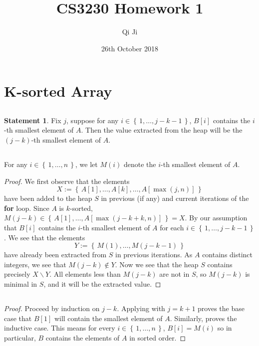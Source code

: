 \documentclass[british,a4paper,]{article}
\title{CS3230 Homework 1}
\author{Qi Ji}
\date{26th October 2018}
\theoremstyle{definition}
\newtheorem{statement}{Statement}[subsection]
\newcommand{\set}[1]{\left\{\, #1 \,\right\}}
\begin{document}
\maketitle

\section{K-sorted Array}
\subsection{}
\begin{statement} \label{q1claim}
    Fix \(j\), suppose for any \(i \in \set{1,\dots,j-k-1}\),
    \(B[i]\) contains the \(i\)-th smallest element of \(A\).
    Then the value extracted from the heap will be the \((j-k)\)-th smallest element of \(A\).
\end{statement}

\subsection{}
For any \(i \in \set{1,\dots,n}\), we let \(M(i)\) denote the \(i\)-th smallest element of \(A\).

\begin{proof}
    We first observe that the elements
    \[ X := \set{ A[1], \dots, A[k], \dots, A[\max(j,n)] } \]
    have been added to the heap \(S\) in previous (if any) and current iterations of the \textbf{for} loop.
    Since \(A\) is \(k\)-sorted, \(M(j-k) \in \set{A[1],\dots,A[\max(j-k+k,n)]} = X\).
    By our assumption that \(B[i]\) contains the \(i\)-th smallest element of \(A\) for each \(i\in\set{1,\dots, j-k-1}\).
    We see that the elements
    \[ Y := \set{ M(1), \dots, M(j-k-1) } \]
    have already been extracted from \(S\) in previous iterations.
    As \(A\) contains distinct integers, we see that \(M(j-k)\notin Y\).
    Now we see that the heap \(S\) contains precisely \(X \smallsetminus Y\).
    All elements less than \(M(j-k)\) are not in \(S\), so
    \(M(j-k)\) is minimal in \(S\), and it will be the extracted value.
\end{proof}

\subsection{}
\begin{proof}
    Proceed by induction on \(j-k\).
    Applying  with \(j = k+1\) proves the base case that \(B[1]\) will contain the smallest element of \(A\).
    Similarly,  proves the inductive case.
    This means for every \(i\in\set{1,\dots,n}\), \(B[i] = M(i)\) so in particular, \(B\) contains the elements of \(A\) in sorted order.
\end{proof}
\end{document}

